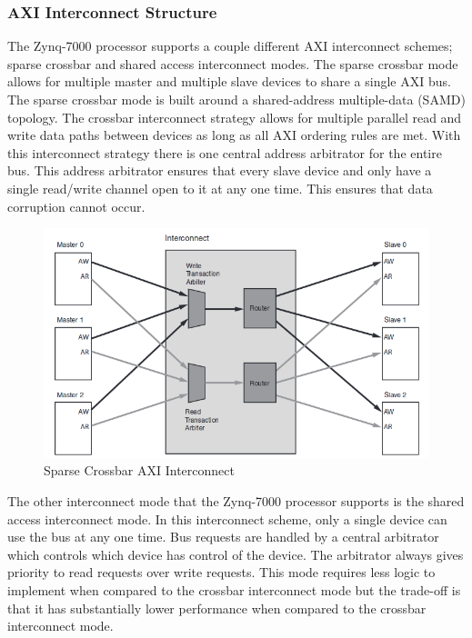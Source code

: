\documentclass[journal]{IEEEtran}
\begin{document}
\subsubsection{AXI Interconnect Structure}
The Zynq-7000 processor supports a couple different AXI interconnect schemes; sparse crossbar and shared access interconnect modes. The sparse crossbar mode allows for multiple master and multiple slave devices to share a single AXI bus. The sparse crossbar mode is built around a shared-address multiple-data (SAMD) topology. The crossbar interconnect strategy allows for multiple parallel read and write data paths between devices as long as all AXI ordering rules are met. With this interconnect strategy there is one central address arbitrator for the entire bus. This address arbitrator ensures that every slave device and only have a single read/write channel open to it at any one time. This ensures that data corruption cannot occur. \\


\begin{figure}[!th]
\centering
\includegraphics[scale=.3]{Images/Crossbar_Interconnect.png}
\caption{Sparse Crossbar AXI Interconnect \cite{AXI_Reference_Guide}}
\label{fig:Crossbar_Interconnect}
\end{figure} 


The other interconnect mode that the Zynq-7000 processor supports is the shared access interconnect mode. In this interconnect scheme, only a single device can use the bus at any one time. Bus requests are handled by a central arbitrator which controls which device has control of the device. The arbitrator always gives priority to read requests over write requests. This mode requires less logic to implement when compared to the crossbar interconnect mode but the trade-off is that it has substantially lower performance when compared to the crossbar interconnect mode.
\end{document}
